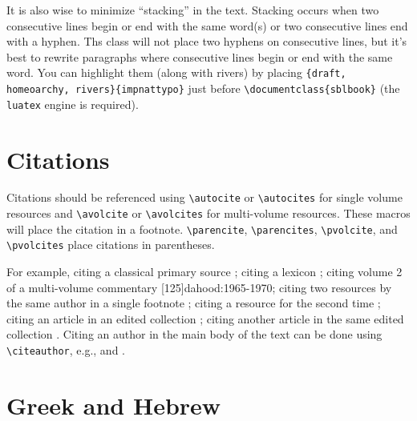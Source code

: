 \documentclass[sblidx={ancient sources, modern authors, subject}]{sblbook}
\begin{document}
It is also wise to minimize “stacking” in the text. Stacking
occurs when two consecutive lines begin or end with the same word(s) or two
consecutive lines end with a hyphen. Ths class will not place two hyphens on
consecutive lines, but it's best to rewrite paragraphs where consecutive lines
begin or end with the same word. You can highlight them (along with rivers) by
placing
\texttt{\string\PassOptionsToPackage\{draft,\,homeoarchy,\,rivers\}\{impnattypo\}}
just before \verb|\documentclass{sblbook}| (the \texttt{luatex} engine is
required).

\chapter{Citations}

%
Citations should be referenced using \verb+\autocite+ or \verb+\autocites+ for
single volume resources and \verb+\avolcite+ or \verb+\avolcites+ for
multi-volume resources. These macros will place the citation in a footnote.
\verb+\parencite+, \verb+\parencites+, \verb+\pvolcite+, and \verb+\pvolcites+
place citations in parentheses.

For example, citing a classical primary source ;
citing a lexicon \autocite[\foreignlanguage{polytonicgreek}{παρρησία}]{BDAG};
citing volume 2 of a multi-volume commentary
[125]{dahood:1965-1970}; citing two resources by the same author
in a single footnote \autocites[504]{harrington:1970}[241]{harrington:1986};
citing a resource for the second time \autocite[505]{harrington:1970}; citing
an article in an edited collection \autocite{collins:1986}; citing another
article in the same edited collection \autocite{attridge:1986}. Citing an
author in the main body of the text can be done using \verb+\citeauthor+,
e.g., \citeauthor{scott+etal:1993} and \citeauthor{robinson+koester:1971}
\autocite[See][]{scott+etal:1993,robinson+koester:1971}.

\chapter{Greek and Hebrew}
\end{document}
